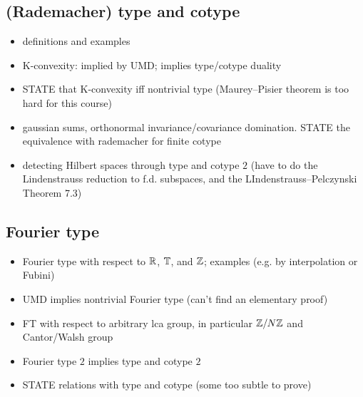 

\subsection{(Rademacher) type and cotype}

\begin{itemize}
\item definitions and examples
\item K-convexity: implied by UMD; implies type/cotype duality
\item STATE that K-convexity iff nontrivial type (Maurey--Pisier theorem is too hard for this course)
\item gaussian sums, orthonormal invariance/covariance domination. STATE the equivalence with rademacher for finite cotype
\item detecting Hilbert spaces through type and cotype $2$ (have to do the Lindenstrauss reduction to f.d. subspaces, and the LIndenstrauss--Pelczynski Theorem 7.3)
\end{itemize}

\subsection{Fourier type}

\begin{itemize}
\item Fourier type with respect to $\mathbb{R}$, $\mathbb{T}$, and $\mathbb{Z}$; examples (e.g. by interpolation or Fubini)
\item UMD implies nontrivial Fourier type (can't find an elementary proof)
\item FT with respect to arbitrary lca group, in particular $\mathbb{Z}/N\mathbb{Z}$ and Cantor/Walsh group
\item Fourier type $2$ implies type and cotype $2$
\item STATE relations with type and cotype (some too subtle to prove)
\end{itemize}


